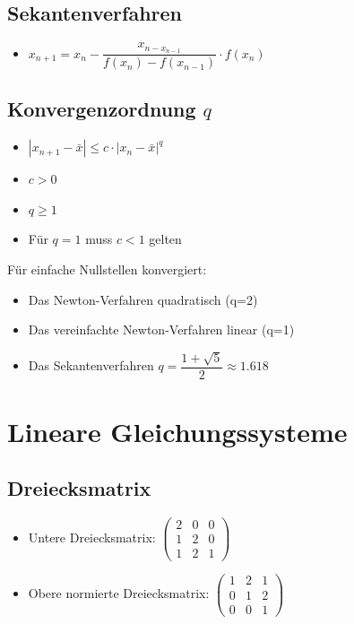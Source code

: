 \documentclass[8pt,a4paper]{scrartcl}
\begin{document}
\begin{multicols*}{3}
		\subsection{Sekantenverfahren}
			\begin{itemize}\itemsep0pt	
				\item $x_{n+1} = x_{n} - \dfrac{x_{n - x_{n-1}}}{f(x_{n}) - f(x_{n-1})} \cdot f(x_{n})$
			\end{itemize}
		\subsection{Konvergenzordnung $q$}
			\begin{itemize}\itemsep0pt	
				\item $|x_{n+1} - \bar{x}| \leq c \cdot |x_{n} - \bar{x}|^{q}$				
				\item $c>0$
				\item $q\geq 1$
				\item Für $q=1$ muss $c<1$ gelten
			\end{itemize}
		
		
			Für einfache Nullstellen konvergiert:
			\begin{itemize}\itemsep0pt	
				\item Das Newton-Verfahren quadratisch (q=2)
				\item Das vereinfachte Newton-Verfahren linear (q=1)
				\item Das Sekantenverfahren $q = \dfrac{1+\sqrt{5}}{2} \approx 1.618$
			\end{itemize}
		
		
	\section{Lineare Gleichungssysteme}
		\subsection{Dreiecksmatrix}
			\begin{itemize}\itemsep0pt		
				\item Untere Dreiecksmatrix: $\begin{pmatrix}2&0&0\\1&2&0\\1&2&1\end{pmatrix}$
				\item Obere normierte Dreiecksmatrix: $\begin{pmatrix}1&2&1\\0&1&2\\0&0&1\end{pmatrix}$
			\end{itemize}
			

\end{multicols*}
\end{document}
